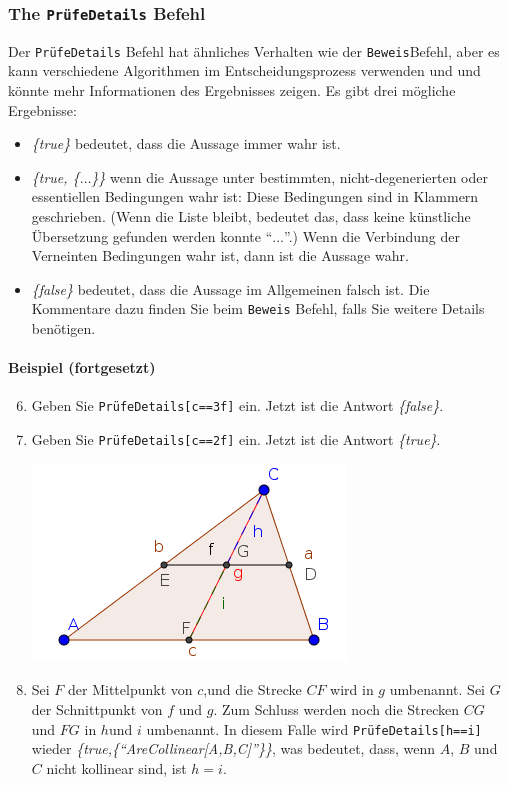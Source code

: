 \documentclass{article}
\begin{document}
\subsubsection{The \texttt{PrüfeDetails} Befehl}
Der \texttt{PrüfeDetails} Befehl hat ähnliches Verhalten wie der \texttt{Beweis}Befehl, aber es kann verschiedene Algorithmen im Entscheidungsprozess verwenden und und könnte mehr Informationen des Ergebnisses zeigen. Es gibt drei mögliche Ergebnisse:
\begin{itemize}
    \item \textit{\{true\}} bedeutet, dass die Aussage immer wahr ist.
    \item \textit{\{true, \{$\ldots$\}\}} wenn die Aussage unter bestimmten, nicht-degenerierten oder essentiellen Bedingungen wahr ist: Diese Bedingungen sind in Klammern geschrieben. (Wenn die Liste bleibt, bedeutet das, dass keine künstliche Übersetzung gefunden werden konnte ``$\ldots$''.) Wenn die Verbindung der Verneinten Bedingungen wahr ist, dann ist die Aussage wahr.
    \item \textit{\{false\}} bedeutet, dass die Aussage im Allgemeinen falsch ist. Die Kommentare dazu finden Sie beim \texttt{Beweis} Befehl, falls Sie weitere Details benötigen.
\end{itemize}
\paragraph{Beispiel (fortgesetzt)}
\begin{enumerate}
\setcounter{enumi}{5}
    \item Geben Sie \texttt{PrüfeDetails[c==3f]} ein. Jetzt ist die Antwort \textit{\{false\}}.
    \item Geben Sie \texttt{PrüfeDetails[c==2f]} ein. Jetzt ist die Antwort \textit{\{true\}}.
\begin{center}
\includegraphics[scale=0.5]{ProveDetails-example-1}
\end{center}
    \item Sei $F$ der Mittelpunkt von $c$,und die Strecke $CF$ wird in $g$ umbenannt. Sei $G$ der Schnittpunkt von $f$ und $g$. Zum Schluss werden noch die Strecken $CG$ und $FG$ in $h$und $i$ umbenannt. In diesem Falle wird \texttt{PrüfeDetails[h==i]} wieder \textit{\{true,\{``AreCollinear[A,B,C]''\}\}}, was bedeutet, dass, wenn $A$, $B$ und $C$ nicht kollinear sind, ist $h=i$.
\end{enumerate}
\end{document}
